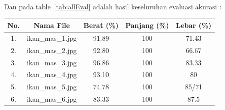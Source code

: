 Dan pada table~\ref{tab:allEval} adalah hasil keseluruhan evaluasi akurasi :

\begin{table}[H]
    \centering
    \begin{tabular}{|c|c|c|c|c|}
        \hline
        No. & Nama File & Berat (\%) & Panjang (\%) & Lebar (\%) \\
        \hline
        1. & ikan\_mas\_1.jpg & 91.89 & 100 & 71.43 \\
        \hline
        2. & ikan\_mas\_2.jpg & 92.80 & 100 & 66.67 \\
        \hline
        3. & ikan\_mas\_3.jpg & 96.86 & 100 & 83.33 \\
        \hline
        4. & ikan\_mas\_4.jpg & 93.10 & 100 & 80 \\
        \hline
        5. & ikan\_mas\_5.jpg & 74.78 & 100 & 85/71 \\
        \hline
        6. & ikan\_mas\_6.jpg & 83.33 & 100 & 87.5 \\
        \hline

    \end{tabular}
    \end{table}
